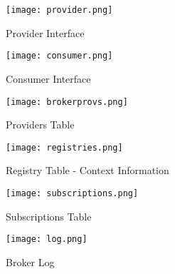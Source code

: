 \begin{figure}[h]
	\centering
	\texttt{[image: provider.png]}
	\caption{Provider Interface}
	\label{fig:provider}
	
\end{figure}

\begin{figure}[h]
	\centering
	\texttt{[image: consumer.png]}
	\caption{Consumer Interface}
	\label{fig:consumer}
	
\end{figure}

\begin{figure}[h]
	\centering
	\texttt{[image: brokerprovs.png]}
	\caption{Providers Table}
	\label{fig:brokerprovs}
	
\end{figure}

\begin{figure}[h]
	\centering
	\texttt{[image: registries.png]}
	\caption{Registry Table - Context Information}
	\label{fig:registries}
	
\end{figure}

\begin{figure}[h]
	\centering
	\texttt{[image: subscriptions.png]}
	\caption{Subscriptions Table}
	\label{fig:subscriptions}
	
\end{figure}

\begin{figure}[h]
	\centering
	\texttt{[image: log.png]}
	\caption{Broker Log}
	\label{fig:log}
	
\end{figure}

